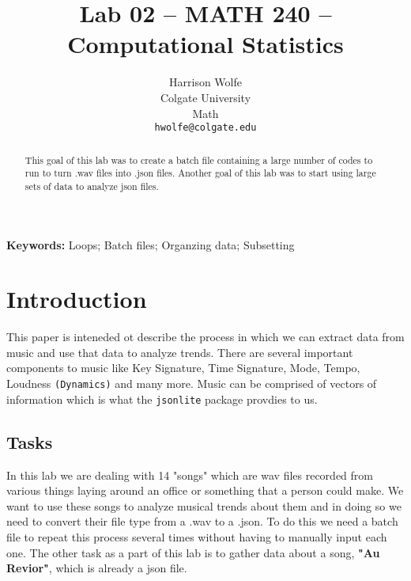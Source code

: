 \documentclass{article}\usepackage[]{graphicx}\usepackage[]{xcolor}
\begin{document}
\vspace{-1in}
\title{Lab 02 -- MATH 240 -- Computational Statistics}

\author{
  Harrison Wolfe \\
  Colgate University  \\
  Math  \\
  {\tt hwolfe@colgate.edu}
}

\date{}

\maketitle

\begin{multicols}{2}
\begin{abstract}

This goal of this lab was to create a batch file containing a large number of codes to run to turn .wav files into .json files. Another goal of this lab was to start using large sets of data to analyze json files. 
\end{abstract}

\noindent \textbf{Keywords:} Loops; Batch files; Organzing data; Subsetting

\section{Introduction}

This paper is inteneded ot describe the process in which we can extract data from music and use that data to analyze trends. There are several important components to music like Key Signature, Time Signature, Mode, Tempo, Loudness \verb|(Dynamics)| and many more. Music can be comprised of vectors of information which is what the \texttt{jsonlite} package provdies to us. \citep{jsonlite} 
\subsection{Tasks}
In this lab we are dealing with 14 "songs" which are wav files recorded from various things laying around an office or something that a person could make. We want to use these songs to analyze musical trends about them and in doing so we need to convert their file type from a .wav to a .json. To do this we need a batch file to repeat this process several times without having to manually input each one. The other task as a part of this lab is to gather data about a song, \textbf{"Au Revior"}, which is already a json file. 




\end{multicols}
\end{document}
